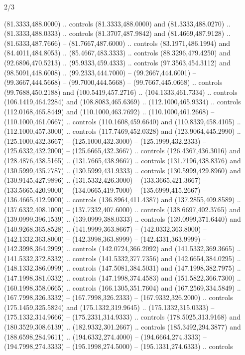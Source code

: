 \begin{flagdescription}{2/3}
\begin{scope}[xshift=0.5\flaglength,yshift=0.5\flagwidth,scale=\flagwidth/525.28]
\begin{scope}[y=0.1mm, x=0.1mm, yscale=-1,shift={(-381.5,-404)}]
\begin{scope}[shift={(5.25001,4.53053)},miter limit=4.00,line width=0.800\lw]
  (81.3333,488.0000) .. controls (81.3333,488.0000) and (81.3333,488.0270) ..
  (81.3333,488.0333) .. controls (81.3707,487.9842) and (81.4669,487.9128) ..
  (81.6333,487.7666) -- (81.7667,487.6000) .. controls (83.1971,486.1994) and
  (84.4011,484.8053) .. (85.4667,483.3333) .. controls (88.3296,479.4250) and
  (92.6896,470.5213) .. (95.9333,459.4333) .. controls (97.3563,454.3112) and
  (98.5091,448.6008) .. (99.2333,444.7000) -- (99.2667,444.6001) --
  (99.3667,444.5668) -- (99.7000,444.5668) -- (99.7667,445.0668) .. controls
  (99.7688,450.2188) and (100.5419,457.2716) .. (104.1333,461.7334) .. controls
  (106.1419,464.2284) and (108.8083,465.6369) .. (112.1000,465.9334) .. controls
  (112.0168,465.8449) and (110.1000,463.7692) .. (110.1000,461.2668) --
  (110.1000,461.0667) .. controls (110.1608,459.6640) and (110.8339,458.4105) ..
  (112.1000,457.3000) .. controls (117.7469,452.0328) and (123.9064,445.2990) ..
  (125.1000,432.3667) -- (125.1000,432.3000) -- (125.1999,432.2333) --
  (125.6332,432.2000) -- (125.6665,432.3667) .. controls (126.4367,436.3016) and
  (128.4876,438.5165) .. (131.7665,438.9667) .. controls (131.7196,438.8376) and
  (130.5999,435.7787) .. (130.5999,431.9333) .. controls (130.5999,429.8960) and
  (130.9145,427.9896) .. (131.5332,426.3000) -- (133.3665,421.3667) --
  (133.5665,420.9000) -- (134.0665,419.7000) -- (135.6999,415.2667) --
  (136.4665,412.9000) .. controls (136.8964,411.4387) and (137.2855,409.8589) ..
  (137.6332,408.1000) -- (137.7332,407.6000) .. controls (138.6697,402.3765) and
  (139.0999,396.1539) .. (139.0999,388.0333) .. controls (139.0999,371.6440) and
  (140.9268,365.8528) .. (141.9999,363.8667) -- (142.0332,363.8000) --
  (142.1332,363.8000) -- (142.3998,363.8999) -- (142.4331,363.9999) --
  (142.3998,364.2999) .. controls (142.0724,366.2092) and (141.5332,369.3665) ..
  (141.5332,372.8332) .. controls (141.5332,377.7356) and (142.6654,384.0295) ..
  (148.1332,386.0999) .. controls (147.5081,384.5031) and (147.1998,382.7975) ..
  (147.1998,381.0332) .. controls (147.1998,374.4583) and (151.5822,366.7300) ..
  (160.1998,358.0665) .. controls (166.1305,351.7604) and (167.2569,334.5849) ..
  (167.7998,326.3332) -- (167.7998,326.2333) -- (167.9332,326.2000) .. controls
  (175.1459,325.5824) and (175.1332,319.9645) .. (175.1332,315.0333) --
  (175.1332,314.9666) -- (175.2331,314.9333) .. controls (178.5025,313.9168) and
  (180.3529,308.6139) .. (182.9332,301.2667) .. controls (185.3492,294.3877) and
  (188.6598,284.9611) .. (194.6332,274.4000) -- (194.6664,274.3333) --
  (194.7998,274.3333) -- (195.1998,274.5000) -- (195.1331,274.6333) .. controls

\end{scope}
\end{scope}
\end{scope}
\end{flagdescription}
